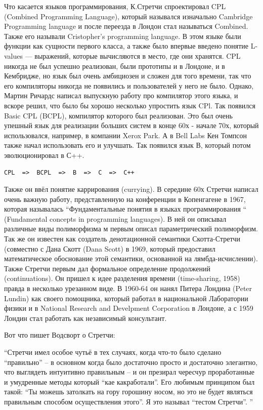 \documentclass[14pt]{matmex-diploma-custom}
\begin{document}
Что касается языков программирования, К.Стретчи спроектировал CPL (Combined Programming Language), который назывался изначально Cambridge Programming language и после переезда в Лондон стал называться Combined. Также его называли Cristopher’s programming language. В этом языке были функции как сущности первого класса, а также было впервые введено понятие L-values --- выражений, которые вычисляются в место, где они хранятся. CPL никогда не был успешно реализован, были прототипы и в Лондоне, и в Кембридже, но язык был очень амбициозен и сложен для того времени, так что его компиляторы никогда не появились и пользователей у него не было. Однако, Мартин Ричардс написал выпускную работу про компилятор этого языка, и вскоре решил, что было бы хорошо несколько упростить язык CPl. Так появился Basic CPL (BCPL), компилятор которого был реализован. Это был очень упешный язык для реализации больших систем в конце 60х - начале 70х, который использовался, например, в компании Xerox Park. А в Bell Labs Кен Томпсон также начал использовать его и улучшать. Так появился язык В, который потом эволюционировал в С++.

\begin{verbatim}
CPL  =>  BCPL  =>  B  =>  C  =>  C++
\end{verbatim}

Также он ввёл понятие каррирования (currying). В середине 60х Стретчи написал очень важную работу, представленную на конференции в Копенгагене в 1967, которая называлась  “Фундаментальные понятия в языках программирования “ (Fundamental concepts in programming languages). В ней он описывал различные виды полиморфизма м первым описал параметрический полиморфизм. Так же он известен как создатель денотационной семантики Скотта-Стретчи (совместно с Дана Скотт (Dana Scott) в 1969, который предоставил математическое обоснование этой семантики, основанной на лямбда-исчислении). Также Стретчи первым дал формальное определение продолжений (continuations). Он пришел к идее разделения времени (time-sharing, 1958) правда в несколько урезанном виде. В 1960-64 он нанял Питера Лондина (Peter Lundin) как своего помощника, который работал в национальной Лаборатории физики и в National Research and Develpment Corporation в Лондоне, а с 1959 Лондин стал работать как независимый консультант. 

\begin{framed}
Вот что пишет Водсворт о Стретчи:

“Стретчи имел особое чутьё в тех случаях, когда что-то было сделано “правильно” -- в основном когда было достаточно просто и достаточно элегантно, что выглядеть интуитивно правильным -- и он презирал чересчур проработанные и умудренные методы который “кае какработали”. Его любимым принципом был такой: “Ты можешь затолкать на гору горошину носом, но это не будет являться правильным способом осуществления этого”. Я это называл “тестом Стретчи”.
”
\end{framed}
\end{document}
